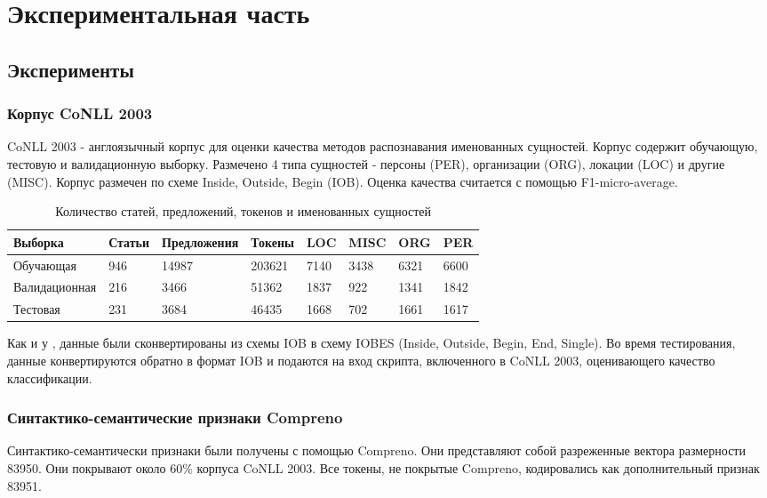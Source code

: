 \chapter{Экспериментальная часть}

\section{Эксперименты}

\subsection{Корпус CoNLL 2003}

CoNLL 2003 \citep{tjong2003introduction} - англоязычный корпус для оценки качества
методов распознавания именованных сущностей.
Корпус содержит обучающую, тестовую и валидационную выборку.
Размечено 4 типа сущностей - персоны (PER), организации (ORG), локации (LOC) и другие (MISC).
Корпус размечен по схеме Inside, Outside, Begin (IOB).
Оценка качества считается с помощью F1-micro-average.

\begin{table}[ht]
  \caption{Количество статей, предложений, токенов и именованных сущностей}
  \centering
  \begin{tabular}{ | p{3cm} | p{1.5cm} | p{2.5cm} | p{1.5cm} | p{1cm} | p{1cm} | p{1cm}| p{1cm} |}
    \hline\hline
    Выборка & Статьи & Предложения & Токены & LOC & MISC & ORG & PER \\
    \hline
    Обучающая & 946 & 14987 & 203621 & 7140 & 3438 & 6321 & 6600 \\
    \hline
    Валидационная & 216 & 3466 & 51362 & 1837 & 922 & 1341 & 1842 \\
    \hline
    Тестовая & 231 & 3684 & 46435 & 1668 & 702 & 1661 & 1617 \\
    \hline
  \end{tabular}
\end{table}

Как и у \citep{collobert2011natural}, данные были сконвертированы из схемы IOB
в схему IOBES (Inside, Outside, Begin, End, Single).
Во время тестирования, данные конвертируются обратно в формат IOB и подаются на вход скрипта,
включенного в CoNLL 2003, оценивающего качество классификации.

\subsection{Синтактико-семантические признаки Compreno}
Синтактико-семантически признаки были получены с помощью Compreno.
Они представляют собой разреженные вектора размерности 83950.
Они покрывают около 60\% корпуса CoNLL 2003.
Все токены, не покрытые Compreno, кодировались как дополнительный признак 83951.

